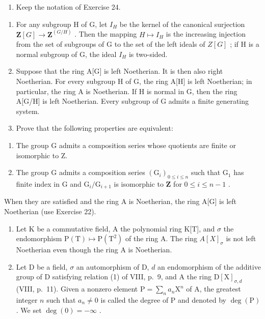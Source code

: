 \begin{enumerate}
\def\labelenumi{\arabic{enumi})}
\setcounter{enumi}{24}
\tightlist
\item
  Keep the notation of Exercise 24.
\end{enumerate}

\begin{enumerate}
\def\labelenumi{\alph{enumi})}
\item
  For any subgroup H of G, let \(I_{H}\) be the kernel of the canonical surjection \(\mathbf{Z}[G] \to \mathbf{Z}^{(G/H)}\) . Then the mapping \(H \mapsto I_{H}\) is the increasing injection from the set of subgroups of G to the set of the left ideals of \(Z[G]\) ; if H is a normal subgroup of G, the ideal \(I_{H}\) is two-sided.
\item
  Suppose that the ring A{[}G{]} is left Noetherian. It is then also right Noetherian. For every subgroup H of G, the ring A{[}H{]} is left Noetherian; in particular, the ring A is Noetherian. If H is normal in G, then the ring A{[}G/H{]} is left Noetherian. Every subgroup of G admits a finite generating system.
\item
  Prove that the following properties are equivalent:
\end{enumerate}

\begin{enumerate}
\def\labelenumi{(\roman{enumi})}
\item
  The group G admits a composition series whose quotients are finite or isomorphic to Z.
\item
  The group G admits a composition series \((\mathrm{G}_i)_{0\leqslant i\leqslant n}\) such that \(\mathrm{G}_1\) has finite index in G and \(\mathrm{G}_i / \mathrm{G}_{i + 1}\) is isomorphic to \(\mathbf{Z}\) for \(0\leqslant i\leqslant n - 1\) .
\end{enumerate}

When they are satisfied and the ring A is Noetherian, the ring A{[}G{]} is left Noetherian (use Exercise 22).

\begin{enumerate}
\def\labelenumi{\arabic{enumi})}
\setcounter{enumi}{25}
\item
  Let K be a commutative field, A the polynomial ring K{[}T{]}, and \(\sigma\) the endomorphism \(\mathrm{P(T)}\mapsto\mathrm{P(T^{2})}\) of the ring A. The ring \(A[X]_{\sigma}\) is not left Noetherian even though the ring A is Noetherian.
\item
  Let D be a field, \(\sigma\) an automorphism of D, \(d\) an endomorphism of the additive group of D satisfying relation (1) of VIII, p.~9, and A the ring \(\mathrm{D}[\mathrm{X}]_{\sigma,d}\) (VIII, p.~11). Given a nonzero element \(\mathrm{P} = \sum_{n}a_{n}\mathrm{X}^{n}\) of A, the greatest integer \(n\) such that \(a_{n}\neq 0\) is called the degree of P and denoted by \(\deg (\mathrm{P})\) . We set \(\deg (0) = -\infty\) .
\end{enumerate}

